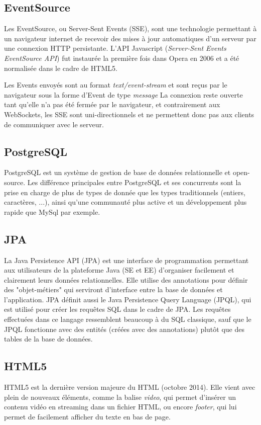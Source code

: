 \documentclass[french]{article}
\begin{document}
\subsection{EventSource}
Les EventSource, ou Server-Sent Events (SSE), sont une technologie permettant à un navigateur internet de recevoir des mises à jour automatiques d'un serveur par une connexion HTTP persistante. L'API Javascript (\textit{Server-Sent Events EventSource API}) fut instaurée la première fois dans Opera en 2006 et a été normalisée dans le cadre de HTML5. \par
Les Events envoyés sont au format \textit{text/event-stream} et sont reçus par le navigateur sous la forme d'Event de type \textit{message} La connexion reste ouverte tant qu'elle n'a pas été fermée par le navigateur, et contrairement aux WebSockets, les SSE sont uni-directionnels et ne permettent donc pas aux clients de communiquer avec le serveur. 

\subsection{PostgreSQL}
PostgreSQL est un système de gestion de base de données relationnelle et open-source. Les différence principales entre PostgreSQL et ses concurrents sont la prise en charge de plus de types de donnée que les types traditionnels (entiers, caractères, ...), ainsi qu'une communauté plus active et un développement plus rapide que MySql par exemple.

\subsection{JPA}
La Java Persistence API (JPA) est une interface de programmation permettant aux utilisateurs de la plateforme Java (SE et EE) d'organiser facilement et clairement leurs données relationnelles. Elle utilise des annotations pour définir des "objet-métiers" qui serviront d'interface entre la base de données et l'application. \newline
JPA définit aussi le Java Persistence Query Language (JPQL), qui est utilisé pour créer les requêtes SQL dans le cadre de JPA. Les requêtes effectuées dans ce langage ressemblent beaucoup à du SQL classique, sauf que le JPQL fonctionne avec des entités (créées avec des annotations) plutôt que des tables de la base de données.

\subsection{HTML5}
HTML5 est la dernière version majeure du HTML (octobre 2014). Elle vient avec plein de nouveaux éléments, comme la balise \textit{video}, qui permet d'insérer un contenu vidéo en streaming dans un fichier HTML, ou encore \textit{footer}, qui lui permet de facilement afficher du texte en bas de page.
\end{document}
